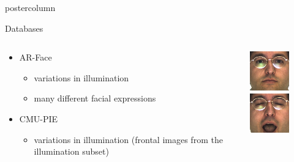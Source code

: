 \documentclass[final,hyperref={pdfpagelabels=false}]{beamer}
\newlength{\columnheight}
\begin{document}
\begin{frame}
\begin{columns}
    \begin{column}{.49\textwidth}
      \begin{beamercolorbox}[center,wd=\textwidth]{postercolumn}
        \begin{minipage}[T]{.95\textwidth} %
          \parbox[t][\columnheight]{\textwidth}{ 
            \begin{block}{Databases}
              \begin{columns}
                \begin{column}{.6\textwidth}
                  \begin{itemize}
                  \item AR-Face 
                    \begin{itemize}
                    \item variations in illumination
                    \item many different facial expressions
                    \end{itemize}
                  \item CMU-PIE
                    \begin{itemize}
                    \item variations in illumination (frontal images from the illumination subset)
                    \end{itemize}
                  \end{itemize}
                \end{column}
                \begin{column}{.39\textwidth}
                  \includegraphics[width=0.22\linewidth]{hanselmann-databases/arface/train/png/occlusions/arneutral/m-016-1}
                  \-
                  \includegraphics[width=0.22\linewidth]{hanselmann-databases/arface/train/png/cropped/m-016-4}

\end{column}
\end{columns}
\end{block}}
\end{minipage}
\end{beamercolorbox}
\end{column}
\end{columns}
\end{frame}
\end{document}
